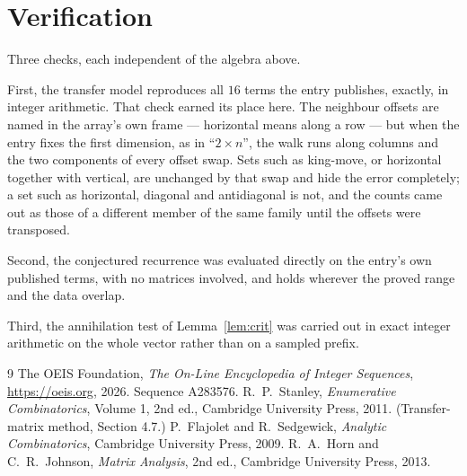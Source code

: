 \documentclass[11pt,a4paper]{article}
\theoremstyle{plain}
\theoremstyle{definition}
\begin{document}
\section{Verification}

Three checks, each independent of the algebra above.

First, the transfer model reproduces all $16$ terms the entry publishes, exactly, in
integer arithmetic. That check earned its place here. The neighbour offsets are named in the
array's own frame --- horizontal means along a row --- but when the entry fixes the first
dimension, as in ``$2\times n$'', the walk runs along columns and the two components of every
offset swap. Sets such as king-move, or horizontal together with vertical, are unchanged by
that swap and hide the error completely; a set such as horizontal, diagonal and antidiagonal
is not, and the counts came out as those of a different member of the same family until the
offsets were transposed.

Second, the conjectured recurrence was evaluated directly on the entry's own published terms,
with no matrices involved, and holds wherever the proved range and the data overlap.

Third, the annihilation test of Lemma~\ref{lem:crit} was carried out in exact integer
arithmetic on the whole vector rather than on a sampled prefix.

\begin{thebibliography}{9}
 The OEIS Foundation, \emph{The On-Line Encyclopedia of Integer
Sequences}, \url{https://oeis.org}, 2026. Sequence A283576.
 R.~P.~Stanley, \emph{Enumerative Combinatorics}, Volume 1, 2nd ed.,
Cambridge University Press, 2011. (Transfer-matrix method, Section 4.7.)
 P.~Flajolet and R.~Sedgewick, \emph{Analytic Combinatorics}, Cambridge
University Press, 2009.
 R.~A.~Horn and C.~R.~Johnson, \emph{Matrix Analysis}, 2nd ed., Cambridge
University Press, 2013.
\end{thebibliography}
\end{document}
